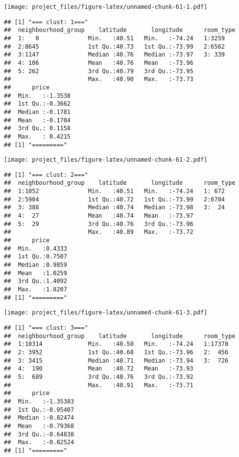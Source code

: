 \documentclass[
]{article}
\begin{document}
\texttt{[image: project\_files/figure-latex/unnamed-chunk-61-1.pdf]}

\begin{verbatim}
## [1] "=== clust: 1==="
##  neighbourhood_group    latitude       longitude      room_type
##  1:   0              Min.   :40.51   Min.   :-74.24   1:3259   
##  2:8645              1st Qu.:40.73   1st Qu.:-73.99   2:6562   
##  3:1147              Median :40.76   Median :-73.97   3: 339   
##  4: 106              Mean   :40.76   Mean   :-73.96            
##  5: 262              3rd Qu.:40.79   3rd Qu.:-73.95            
##                      Max.   :40.90   Max.   :-73.73            
##      price        
##  Min.   :-1.3538  
##  1st Qu.:-0.3662  
##  Median :-0.1781  
##  Mean   :-0.1704  
##  3rd Qu.: 0.1158  
##  Max.   : 0.4215  
## [1] "========="
\end{verbatim}

\texttt{[image: project\_files/figure-latex/unnamed-chunk-61-2.pdf]}

\begin{verbatim}
## [1] "=== clust: 2==="
##  neighbourhood_group    latitude       longitude      room_type
##  1:1052              Min.   :40.51   Min.   :-74.24   1: 672   
##  2:5904              1st Qu.:40.72   1st Qu.:-73.99   2:6704   
##  3: 388              Median :40.74   Median :-73.98   3:  24   
##  4:  27              Mean   :40.74   Mean   :-73.97            
##  5:  29              3rd Qu.:40.76   3rd Qu.:-73.96            
##                      Max.   :40.89   Max.   :-73.72            
##      price       
##  Min.   :0.4333  
##  1st Qu.:0.7507  
##  Median :0.9859  
##  Mean   :1.0259  
##  3rd Qu.:1.4092  
##  Max.   :1.8207  
## [1] "========="
\end{verbatim}

\texttt{[image: project\_files/figure-latex/unnamed-chunk-61-3.pdf]}

\begin{verbatim}
## [1] "=== clust: 3==="
##  neighbourhood_group    latitude       longitude      room_type
##  1:10314             Min.   :40.50   Min.   :-74.24   1:17378  
##  2: 3952             1st Qu.:40.68   1st Qu.:-73.96   2:  456  
##  3: 3415             Median :40.71   Median :-73.94   3:  726  
##  4:  190             Mean   :40.72   Mean   :-73.93            
##  5:  689             3rd Qu.:40.76   3rd Qu.:-73.92            
##                      Max.   :40.91   Max.   :-73.71            
##      price         
##  Min.   :-1.35383  
##  1st Qu.:-0.95407  
##  Median :-0.82474  
##  Mean   :-0.79368  
##  3rd Qu.:-0.64838  
##  Max.   :-0.02524  
## [1] "========="
\end{verbatim}
\end{document}
